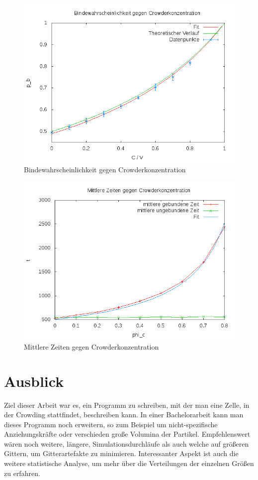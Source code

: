 \documentclass[bachelor,       %
               twoside,        %
               BCOR10mm,       %
               english,ngerman, %
               ]{GAUBM}
\begin{document}
\begin{figure}
  \centering
  \includegraphics[width=0.9\linewidth]{ProbgegenCrowder.png}
  \caption{Bindewahrscheinlichkeit gegen Crowderkonzentration}
  \label{fig:ProbGegenCrowder}
\end{figure}

\begin{figure}
  \centering
  \includegraphics[width=0.9\linewidth]{meantimes.png}
  \caption{Mittlere Zeiten gegen Crowderkonzentration}
  \label{fig:mean}
\end{figure}

\chapter{Ausblick}
Ziel dieser Arbeit war es, ein Programm zu schreiben, mit der man eine Zelle,
in der Crowding stattfindet, beschreiben kann. In einer Bachelorarbeit kann man
dieses Programm noch erweitern, so zum Beispiel um nicht-spezifische Anziehungskräfte oder
verschieden große Volumina der Partikel. Empfehlenswert wären noch weitere, längere,
Simulationsdurchläufe als auch welche auf größeren Gittern, um Gitterartefakte zu
minimieren. Interessanter Aspekt ist auch die weitere statistische Analyse, um mehr
über die Verteilungen der einzelnen Größen zu erfahren.
\end{document}
